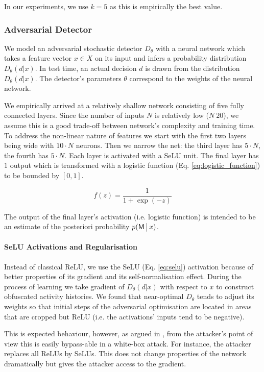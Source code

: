 In our experiments, we use $k=5$ as this is empirically the best value.

\subsubsection{Adversarial Detector}\label{sec:neural_detector}
We model an adversarial stochastic detector $D_\theta$ with a neural network which takes a feature vector $x \in X$ on its input and infers a probability distribution $D_\theta(d|x)$. In test time, an actual decision $d$ is drawn from the distribution $D_\theta(d|x)$. The detector's parameters $\theta$ correspond to the weights of the neural network.

We empirically arrived at a relatively shallow network consisting of five fully connected layers. Since the number of inputs $N$ is relatively low ($N~20$), we assume this is a good trade-off between network's complexity and training time. To address the non-linear nature of features we start with the first two layers being wide with $10 \cdot N$ neurons. Then we narrow the net: the third layer has $5 \cdot N$, the fourth has $5 \cdot N$. Each layer is activated with a SeLU unit. The final layer has $1$ output which is transformed with a logistic function (Eq. \eqref{eq:logistic_function}) to be bounded by $[0,1]$.

\begin{equation}\label{eq:logistic_function}
    f(z) = \frac{1}{1 + \exp(-z)}
\end{equation}

The output of the final layer's activation (i.e. logistic function) is intended to be an estimate of the posteriori probability $p(\mathsf{M} \,\big|\, x)$.

\paragraph{SeLU Activations and Regularisation}
Instead of classical ReLU, we use the SeLU (Eq. \eqref{eq:selu}) activation because of better properties of its gradient and its self-normalisation effect. During the process of learning we take gradient of $D_\theta(d|x)$ with respect to $x$ to construct obfuscated activity histories. We found that near-optimal $D_\theta$ tends to adjust its weights so that initial steps of the adversarial optimisation are located in areas that are cropped but ReLU (i.e. the activations' inputs tend to be negative).

This is expected behaviour, however, as argued in \cite{obfuscated_gradients}, from the attacker's point of view this is easily bypass-able in a white-box attack. For instance, the attacker replaces all ReLUs by SeLUs. This does not change properties of the network dramatically but gives the attacker access to the gradient.


